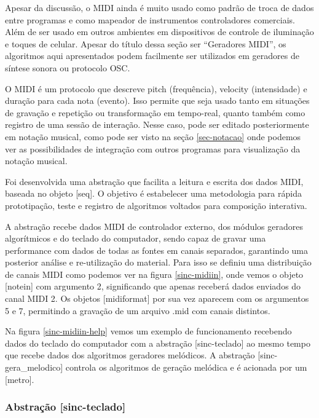 \documentclass{ppgmus}
\begin{document}
Apesar da discussão, o MIDI ainda é muito usado como padrão de troca de dados entre programas e 
como mapeador de instrumentos controladores comerciais. Além de ser usado em outros ambientes
em dispositivos de controle de iluminação e toques de celular. Apesar do título dessa seção
ser ``Geradores MIDI'', os algoritmos aqui apresentados podem facilmente ser utilizados em
geradores de síntese sonora ou protocolo OSC.

O MIDI é um protocolo que descreve pitch (frequência), velocity (intensidade) e duração para cada
nota (evento). Isso permite que seja usado tanto em situações de gravação e repetição ou
transformação em tempo-real, quanto também como registro de uma sessão de interação.
Nesse caso, pode ser editado posteriormente em notação musical, como pode ser
visto na seção \ref{sec-notacao} onde podemos ver as possibilidades de integração
com outros programas para visualização da notação musical.

Foi desenvolvida uma abstração que facilita a leitura e escrita dos dados MIDI, baseada no
objeto [seq]. O objetivo é estabelecer uma metodologia para rápida prototipação, teste e registro
de algoritmos voltados para composição interativa.

A abstração recebe dados MIDI de controlador externo, dos módulos geradores algorítmicos e do
teclado do computador, sendo capaz de gravar uma performance com dados de todas as fontes em
canais separados, garantindo uma posterior análise e re-utilização do material. Para isso
se definiu uma distribuição de canais MIDI como podemos ver na figura \ref{sinc-midiin}, onde vemos
o objeto [notein] com argumento 2, significando que apenas receberá dados enviados do canal MIDI 2.
Os objetos [midiformat] por sua vez aparecem com os argumentos 5 e 7, permitindo a gravação
de um arquivo .mid com canais distintos.


Na figura \ref{sinc-midiin-help} vemos um exemplo de funcionamento recebendo dados do teclado do
computador com a abstração [sinc-teclado] ao mesmo tempo que recebe dados dos algoritmos geradores
melódicos. A abstração [sinc-gera\_melodico] controla os algoritmos de geração melódica e é acionada
por um [metro]. 


\subsubsection{Abstração [sinc-teclado]}


\end{document}
